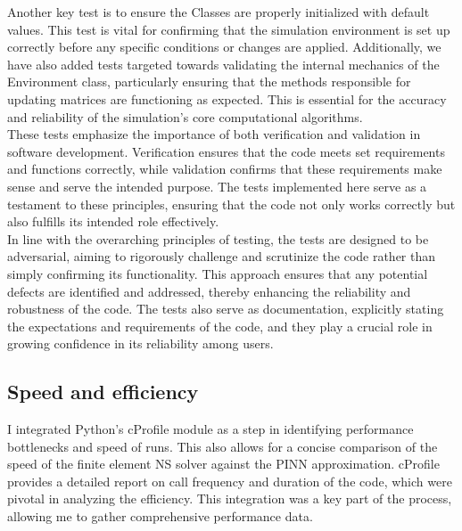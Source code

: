 Another key test is to ensure the Classes are properly initialized with default values. This test is vital for confirming that the simulation environment is set up correctly before any specific conditions or changes are applied. Additionally, we have also added tests targeted towards validating the internal mechanics of the Environment class, particularly ensuring that the methods responsible for updating matrices are functioning as expected. This is essential for the accuracy and reliability of the simulation's core computational algorithms. 
\\

These tests emphasize the importance of both verification and validation in software development. Verification ensures that the code meets set requirements and functions correctly, while validation confirms that these requirements make sense and serve the intended purpose. The tests implemented here serve as a testament to these principles, ensuring that the code not only works correctly but also fulfills its intended role effectively.
\\

In line with the overarching principles of testing, the tests are designed to be adversarial, aiming to rigorously challenge and scrutinize the code rather than simply confirming its functionality. This approach ensures that any potential defects are identified and addressed, thereby enhancing the reliability and robustness of the code. The tests also serve as documentation, explicitly stating the expectations and requirements of the code, and they play a crucial role in growing confidence in its reliability among users.

\subsection{Speed and efficiency}

I integrated Python's cProfile \cite{cprofile} module as a step in identifying performance bottlenecks and speed of runs. This also allows for a concise comparison of the speed of the finite element NS solver against the PINN approximation. cProfile provides a detailed report on call frequency and duration of the code, which were pivotal in analyzing the efficiency. This integration was a key part of the process, allowing me to gather comprehensive performance data.
\\

